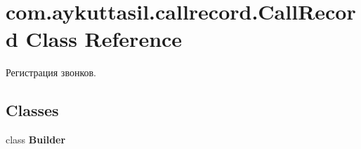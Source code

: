 \hypertarget{classcom_1_1aykuttasil_1_1callrecord_1_1_call_record}{}\section{com.\+aykuttasil.\+callrecord.\+Call\+Record Class Reference}
\label{classcom_1_1aykuttasil_1_1callrecord_1_1_call_record}


Регистрация звонков.  


\subsection*{Classes}
\begin{DoxyCompactItemize}
\item 
class {\bfseries Builder}
\end{DoxyCompactItemize}
